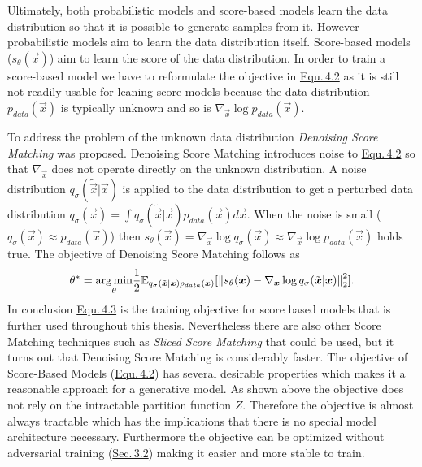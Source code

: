 Ultimately, both probabilistic models and score-based models learn the data distribution so that it is possible to generate samples from it. However probabilistic models aim to learn the data distribution itself. Score-based models ($s_\theta(\vec{x})$) aim to learn the score of the data distribution. In order to train a score-based model we have to reformulate the objective in \hyperref[equ:4.2]{Equ.\,4.2} as it is still not readily usable for leaning score-models because the data distribution $p_{data}(\vec{x})$ is typically unknown and so is $\nabla_{\vec{x}}\log p_{data}(\vec{x})$. 

To address the problem of the unknown data distribution \textit{Denoising Score Matching} \cite{denoise_score} was proposed. Denoising Score Matching introduces noise to \hyperref[equ:4.2]{Equ.\,4.2} so that $\nabla_{\vec{x}}$ does not operate directly on the unknown distribution. A noise distribution $q_\sigma(\tilde{\vec{x}}|\vec{x})$ is applied to the data distribution to get a perturbed data distribution $q_\sigma(\vec{x})=\int q_\sigma(\tilde{\vec{x}}|\vec{x})p_{data}(\vec{x})d\vec{x}$. When the noise is small ($q_\sigma(\vec{x})\approx p_{data}(\vec{x})$) then $s_\theta(\vec{x})=\nabla_{\vec{x}}\log q_\sigma(\vec{x})\approx\nabla_{\vec{x}}\log p_{data}(\vec{x})$ holds true. The objective of Denoising Score Matching follows as
%
\begin{equation} \label{equ:4.3}
    \theta^*=\underset{\theta}{\arg\min}\frac{1}{2}\mathbb{E}_{q_\sigma(\tilde{\boldsymbol{x}}|\boldsymbol{x})p_{data}(\boldsymbol{x})}[\left\lVert s_\theta(\boldsymbol{x})-\nabla_{\boldsymbol{x}}\log q_\sigma(\tilde{\boldsymbol{x}}|\boldsymbol{x})\right\rVert^2_2].
\end{equation}
%
In conclusion \hyperref[equ:4.3]{Equ.\,4.3} is the training objective for score based models that is further used throughout this thesis. Nevertheless there are also other Score Matching techniques such as \textit{Sliced Score Matching} \cite{song2019sliced} that could be used, but it turns out that Denoising Score Matching is considerably faster. The objective of Score-Based Models (\hyperref[equ:4.2]{Equ.\,4.2}) has several desirable properties which makes it a reasonable approach for a generative model. As shown above the objective does not rely on the intractable partition function $Z$. Therefore the objective is almost always tractable which has the implications that there is no special model architecture necessary. Furthermore the objective can be optimized without adversarial training (\hyperref[sec:gans]{Sec.\,3.2}) making it easier and more stable to train.

